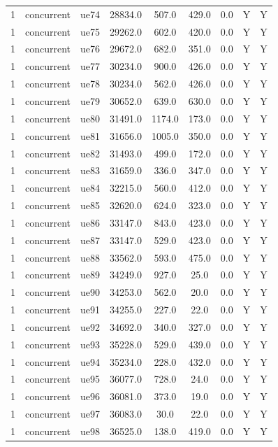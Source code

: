 \begin{table}[ht]
\begin{tabular}{|c|c|c|c|c|c|c|c|c|}
1 & concurrent & ue74 & 28834.0 & 507.0 & 429.0 & 0.0 & Y & Y \\
1 & concurrent & ue75 & 29262.0 & 602.0 & 420.0 & 0.0 & Y & Y \\
1 & concurrent & ue76 & 29672.0 & 682.0 & 351.0 & 0.0 & Y & Y \\
1 & concurrent & ue77 & 30234.0 & 900.0 & 426.0 & 0.0 & Y & Y \\
1 & concurrent & ue78 & 30234.0 & 562.0 & 426.0 & 0.0 & Y & Y \\
1 & concurrent & ue79 & 30652.0 & 639.0 & 630.0 & 0.0 & Y & Y \\
1 & concurrent & ue80 & 31491.0 & 1174.0 & 173.0 & 0.0 & Y & Y \\
1 & concurrent & ue81 & 31656.0 & 1005.0 & 350.0 & 0.0 & Y & Y \\
1 & concurrent & ue82 & 31493.0 & 499.0 & 172.0 & 0.0 & Y & Y \\
1 & concurrent & ue83 & 31659.0 & 336.0 & 347.0 & 0.0 & Y & Y \\
1 & concurrent & ue84 & 32215.0 & 560.0 & 412.0 & 0.0 & Y & Y \\
1 & concurrent & ue85 & 32620.0 & 624.0 & 323.0 & 0.0 & Y & Y \\
1 & concurrent & ue86 & 33147.0 & 843.0 & 423.0 & 0.0 & Y & Y \\
1 & concurrent & ue87 & 33147.0 & 529.0 & 423.0 & 0.0 & Y & Y \\
1 & concurrent & ue88 & 33562.0 & 593.0 & 475.0 & 0.0 & Y & Y \\
1 & concurrent & ue89 & 34249.0 & 927.0 & 25.0 & 0.0 & Y & Y \\
1 & concurrent & ue90 & 34253.0 & 562.0 & 20.0 & 0.0 & Y & Y \\
1 & concurrent & ue91 & 34255.0 & 227.0 & 22.0 & 0.0 & Y & Y \\
1 & concurrent & ue92 & 34692.0 & 340.0 & 327.0 & 0.0 & Y & Y \\
1 & concurrent & ue93 & 35228.0 & 529.0 & 439.0 & 0.0 & Y & Y \\
1 & concurrent & ue94 & 35234.0 & 228.0 & 432.0 & 0.0 & Y & Y \\
1 & concurrent & ue95 & 36077.0 & 728.0 & 24.0 & 0.0 & Y & Y \\
1 & concurrent & ue96 & 36081.0 & 373.0 & 19.0 & 0.0 & Y & Y \\
1 & concurrent & ue97 & 36083.0 & 30.0 & 22.0 & 0.0 & Y & Y \\
1 & concurrent & ue98 & 36525.0 & 138.0 & 419.0 & 0.0 & Y & Y \\

\end{tabular}
\end{table}
